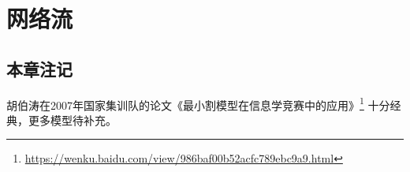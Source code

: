 \chapter{网络流}





\section{本章注记}
胡伯涛在2007年国家集训队的论文《最小割模型在信息学竞赛中的应用》\footnote{
    \url{https://wenku.baidu.com/view/986baf00b52acfc789ebc9a9.html}}
十分经典，更多模型待补充。
